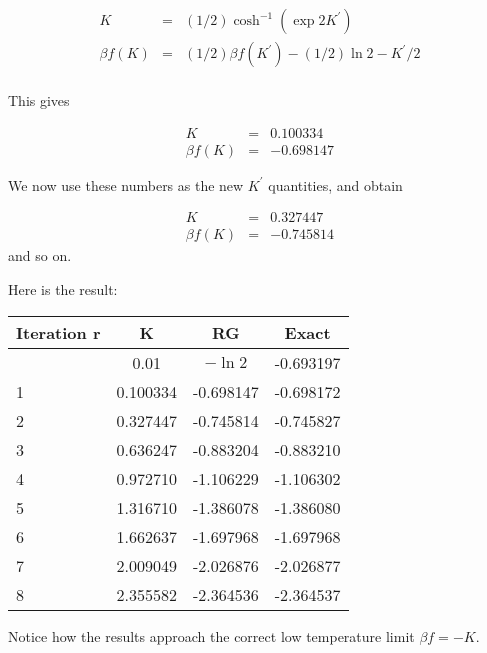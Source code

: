 \documentclass[a4paper,12pt,twoside]{article}
\begin{document}
\begin{enumerate}
\begin{eqnarray*}
K &=& (1/2)\cosh^{-1}(\exp 2K^\prime) \\
\beta f(K) &=& (1/2)\beta f(K^\prime)-(1/2)\ln 2-K^\prime/2\\
\end{eqnarray*}

This gives 

\begin{eqnarray*}
K &=& 0.100334\\
\beta f(K) &=& -0.698147
\end{eqnarray*}

We now use these numbers as the new $K^\prime$ quantities, and obtain

\begin{eqnarray*}
K &=& 0.327447\\
\beta f(K) &=& -0.745814
\end{eqnarray*}
and so on.

Here is the result:

\begin{tabular}{lccc}
Iteration  r & K & RG & Exact\\\hline
 & 0.01     & $-\ln 2$ & -0.693197\\
1 & 0.100334 & -0.698147 & -0.698172\\
2 & 0.327447 & -0.745814 & -0.745827\\
3 & 0.636247 & -0.883204 & -0.883210 \\
4 & 0.972710 & -1.106229 & -1.106302 \\
5 & 1.316710 & -1.386078 & -1.386080 \\
6 & 1.662637 & -1.697968 & -1.697968 \\
7 & 2.009049 & -2.026876 & -2.026877 \\
8 & 2.355582 & -2.364536 & -2.364537 \\
\end{tabular}

\end{enumerate}
Notice how the results approach the correct low temperature limit $\beta f=-K$.
\end{document}
